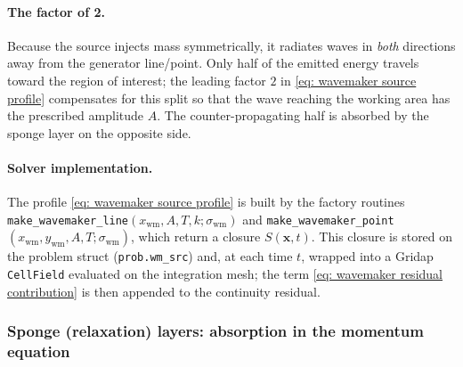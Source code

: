 \paragraph{The factor of 2.} Because the source injects mass symmetrically, it radiates waves in
\emph{both} directions away from the generator line/point. Only half of the emitted energy travels
toward the region of interest; the leading factor $2$ in \eqref{eq: wavemaker source profile}
compensates for this split so that the wave reaching the working area has the prescribed amplitude
$A$. The counter-propagating half is absorbed by the sponge layer on the opposite side.

\paragraph{Solver implementation.} The profile \eqref{eq: wavemaker source profile} is built by the
factory routines \texttt{make\_wavemaker\_line}$(x_{\text{wm}},A,T,k;\sigma_{\text{wm}})$ and
\texttt{make\_wavemaker\_point}$(x_{\text{wm}},y_{\text{wm}},A,T;\sigma_{\text{wm}})$, which return a
closure $S(\mathbf{x},t)$. This closure is stored on the problem struct (\texttt{prob.wm\_src}) and,
at each time $t$, wrapped into a Gridap \texttt{CellField} evaluated on the integration mesh; the term
\eqref{eq: wavemaker residual contribution} is then appended to the continuity residual.

\subsubsection*{Sponge (relaxation) layers: absorption in the momentum equation}

